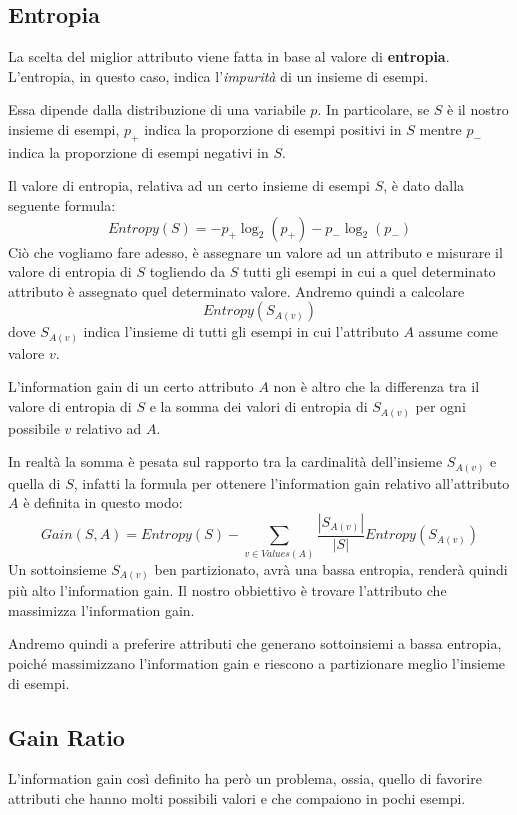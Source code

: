 \subsection{Entropia}
La scelta del miglior attributo viene fatta in base al valore di \textbf{entropia}. L'entropia, in questo caso, indica
l'\emph{impurit\`a} di un insieme di esempi.

Essa dipende dalla distribuzione di una variabile $p$. In particolare, se $S$ \`e il nostro insieme di esempi,
$p_+$ indica la proporzione di esempi positivi in $S$ mentre $p_-$ indica la proporzione di esempi negativi in $S$.

Il valore di entropia, relativa ad un certo insieme di esempi $S$, \`e dato dalla seguente formula:
\[ Entropy(S) = -p_+ \log_2{(p_+)} - p_- \log_2{(p_-)} \]
Ci\`o che vogliamo fare adesso, \`e assegnare un valore ad un attributo e misurare il valore di entropia di $S$
togliendo da $S$ tutti gli esempi in cui a quel determinato attributo \`e assegnato quel determinato valore. Andremo
quindi a calcolare
\[ Entropy(S_{A(v)}) \]
dove $S_{A(v)}$ indica l'insieme di tutti gli esempi in cui l'attributo $A$ assume come valore $v$.

L'information gain di un certo attributo $A$ non \`e altro che la differenza tra il valore di entropia di $S$ e la
somma dei valori di entropia di $S_{A(v)}$ per ogni possibile $v$ relativo ad $A$.

In realt\`a la somma \`e pesata sul rapporto tra la cardinalit\`a dell'insieme $S_{A(v)}$ e quella di $S$, infatti
la formula per ottenere l'information gain relativo all'attributo $A$ \`e definita in questo modo:
\[ Gain(S, A) = Entropy(S) - \sum_{v \in Values(A)} \frac{|S_{A(v)}|}{|S|} Entropy(S_{A(v)}) \]
Un sottoinsieme $S_{A(v)}$ ben partizionato, avr\`a una bassa entropia, render\`a quindi pi\`u alto l'information gain.
Il nostro obbiettivo \`e trovare l'attributo che massimizza l'information gain.

Andremo quindi a preferire attributi che generano sottoinsiemi a bassa entropia, poich\'e massimizzano l'information
gain e riescono a partizionare meglio l'insieme di esempi.

\subsection{Gain Ratio}
L'information gain cos\`i definito ha per\`o un problema, ossia, quello di favorire attributi che hanno molti possibili
valori e che compaiono in pochi esempi.

